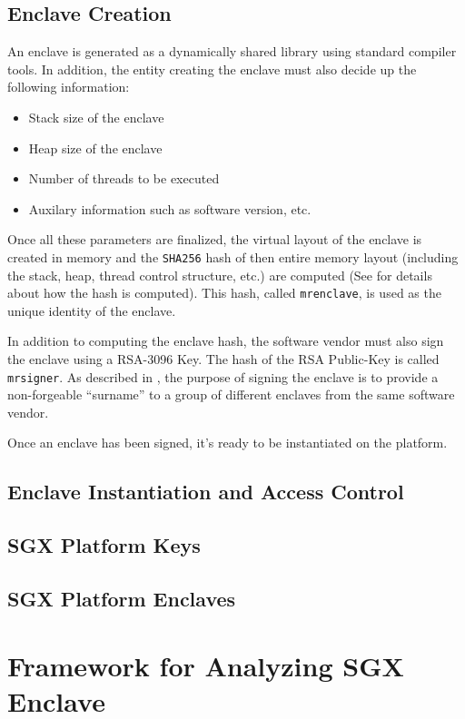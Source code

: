 \documentclass[11pt]{article}
\begin{document}
  \subsection{Enclave Creation}
  An enclave is generated as a dynamically shared library using
  standard compiler tools. In addition, the entity creating the
  enclave must also decide up the following information:

  \begin{itemize}
  \item Stack size of the enclave
  \item Heap size of the enclave
  \item Number of threads to be executed
  \item Auxilary information such as software version, etc.
  \end{itemize}

  Once all these parameters are finalized, the virtual layout of the
  enclave is created in memory and the \texttt{SHA256}  hash of then
  entire memory layout (including the stack, heap, thread control
  structure, etc.) are computed (See \cite{intelsdm} for details
  about how the hash is computed). This hash, called
  \texttt{mrenclave}, is used as the unique identity of the enclave.

  In addition to computing the enclave hash, the software vendor must
  also sign the enclave using a RSA-3096 Key. The hash of the RSA
  Public-Key is called \texttt{mrsigner}. As described in
  \cite{surnaming}, the purpose of signing the enclave is to provide a
  non-forgeable ``surname'' to a  group of different enclaves from the
  same software vendor.

  Once an enclave has been signed, it's ready to be instantiated on
  the platform.

  \subsection{Enclave Instantiation and Access Control}


  \subsection{SGX Platform Keys}
  \subsection{SGX Platform Enclaves}

  \section{Framework for Analyzing SGX Enclave}
\end{document}
